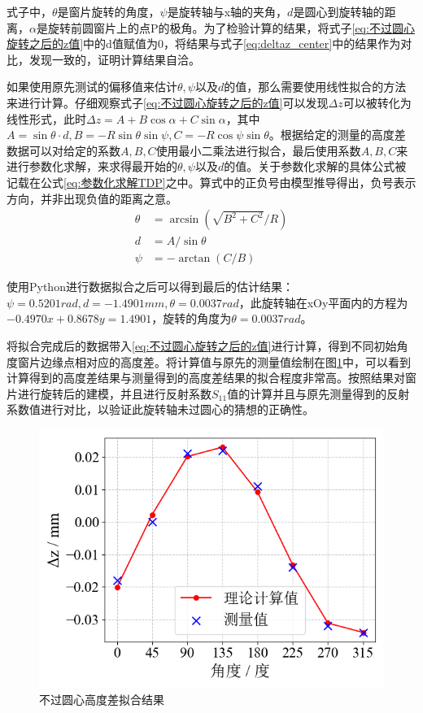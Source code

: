 \documentclass[master]{thesis-uestc}
\begin{document}
式子中，\(\theta\)是窗片旋转的角度，\(\psi\)是旋转轴与x轴的夹角，\(d\)是圆心到旋转轴的距离，\(\alpha\)是旋转前圆窗片上的点P的极角。为了检验计算的结果，将式子\ref{eq:不过圆心旋转之后的z值}中的d值赋值为0，将结果与式子\ref{eq:deltaz_center}中的结果作为对比，发现一致的，证明计算结果自洽。

如果使用原先测试的偏移值来估计\(\theta, \psi\)以及\(d\)的值，那么需要使用线性拟合的方法来进行计算。仔细观察式子\ref{eq:不过圆心旋转之后的z值}可以发现\(\Delta z\)可以被转化为线性形式，此时\(\Delta z =A+B \cos \alpha +C \sin \alpha \)，其中\(A = \sin \theta \cdot d, B = -R \sin \theta \sin \psi, C = -R \cos \psi \sin \theta \)。根据给定的测量的高度差数据可以对给定的系数\(A, B, C\)使用最小二乘法进行拟合，最后使用系数\(A, B, C\)来进行参数化求解，来求得最开始的\(\theta, \psi\)以及\(d\)的值。关于参数化求解的具体公式被记载在公式\ref{eq:参数化求解TDP}之中。算式中的正负号由模型推导得出，负号表示方向，并非出现负值的距离之意。
\begin{subequations}\label{eq:参数化求解TDP}
    \begin{align}
        \theta &= \arcsin(\sqrt{B^2 + C^2}/R)  \label{eq:sin_theta}\\
        d &= A / \sin\theta  \\
        \psi &= - \arctan(C/B) 
    \end{align}
\end{subequations}

使用Python进行数据拟合之后可以得到最后的估计结果：\(\psi = 0.5201 rad, d = -1.4901 mm , \theta = 0.0037 rad\)，此旋转轴在xOy平面内的方程为\(-0.4970 x + 0.8678 y = 1.4901\)，旋转的角度为\(\theta = 0.0037 rad\)。

将拟合完成后的数据带入\ref{eq:不过圆心旋转之后的z值}进行计算，得到不同初始角度窗片边缘点相对应的高度差。将计算值与原先的测量值绘制在图\ref{fig:测量z值与计算z值}中，可以看到计算得到的高度差结果与测量得到的高度差结果的拟合程度非常高。按照结果对窗片进行旋转后的建模，并且进行反射系数\(S_{11}\)值的计算并且与原先测量得到的反射系数值进行对比，以验证此旋转轴未过圆心的猜想的正确性。
\begin{figure}[!htb]
    \centering
    \includegraphics[width=0.47\linewidth]{pic/chapter5/不过圆心高度差拟合.png}
    \caption{不过圆心高度差拟合结果}
    \label{fig:测量z值与计算z值}
\end{figure}
\end{document}
